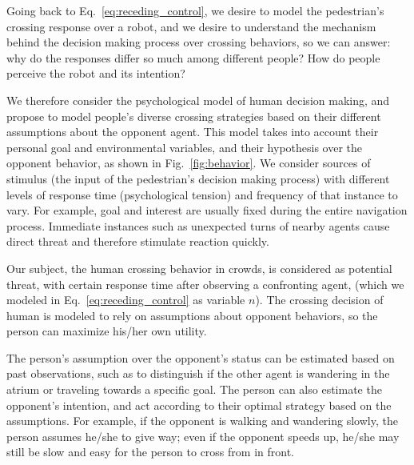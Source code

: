 \documentclass[conference]{IEEEtran}
\begin{document}
Going back to Eq.~\ref{eq:receding_control}, we desire to model the 
pedestrian's crossing response over a robot, and we desire to understand the 
mechanism behind the decision making process over crossing behaviors, so we 
can answer: why do the responses differ so much among different people? How do 
people perceive the robot and its intention? 

We therefore consider the psychological model of human decision
making, and propose to model people's diverse crossing strategies
based on their different assumptions about the opponent agent. This
model takes into account their personal goal and
environmental variables, and their hypothesis over the opponent
behavior, as shown in Fig.~\ref{fig:behavior}. We consider sources of
stimulus (the input of the pedestrian's decision making process) with
different levels of response time (psychological tension) and
frequency of that instance to vary. For example, goal and interest are
usually fixed during the entire navigation process. Immediate
instances such as unexpected turns of nearby agents cause direct
threat and therefore stimulate reaction quickly.

Our subject, the human crossing behavior in crowds, is considered as potential 
threat, with certain response time after observing a confronting agent, (which 
we modeled in Eq.~\ref{eq:receding_control} as variable $n$). The crossing 
decision of human is modeled to rely on assumptions about opponent behaviors, so the 
person can maximize his/her own utility. 

The person's assumption over the opponent's status can be estimated based on past 
observations, such as to distinguish if the other agent is wandering in the atrium or 
traveling towards a specific goal. The person can also estimate the opponent's 
intention, and act according to their optimal strategy based on the 
assumptions. For example, if the opponent is walking and wandering slowly, the 
person assumes he/she to give way; even if the opponent speeds up, he/she may 
still be slow and easy for the person to cross from in front.
\end{document}
